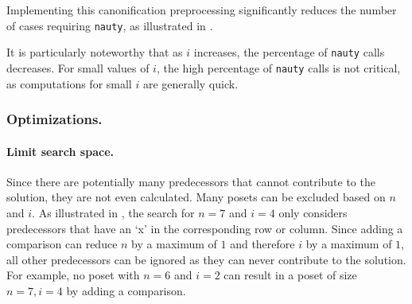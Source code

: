 \documentclass[twoside,leqno,twocolumn]{article}
\begin{document}
Implementing this canonification preprocessing significantly reduces the number of cases requiring \texttt{nauty}, as illustrated in .

\begin{table}[!t]
  \renewcommand{\arraystretch}{1.1}
  \caption{Percentage of canonification requiring \texttt{nauty} for variable $n$ and $i$, where lower values are preferable.}
  \label{table:nauty-ratio}
  \centering
  \small
\end{table}

It is particularly noteworthy that as $i$ increases, the percentage of \texttt{nauty} calls decreases.
For small values of $i$, the high percentage of \texttt{nauty} calls is not critical, as computations for small $i$ are generally quick.

\subsubsection{Optimizations.}

\paragraph{Limit search space.}
Since there are potentially many predecessors that cannot contribute to the solution, they are not even calculated.
Many posets can be excluded based on $n$ and $i$.
As illustrated in , the search for $n = 7$ and $i = 4$ only considers predecessors that have an `x' in the corresponding row or column.
Since adding a comparison can reduce $n$ by a maximum of $1$ and therefore $i$ by a maximum of $1$, all other predecessors can be ignored as they can never contribute to the solution.
For example, no poset with $n = 6$ and $i = 2$ can result in a poset of size $n = 7, i = 4$ by adding a comparison.
\end{document}
